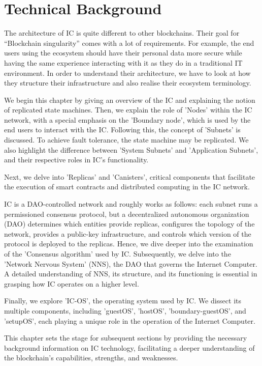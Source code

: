 \chapter{Technical Background}
\label{chap:chaptertwo}

The architecture of IC is quite different to other blockchains. Their goal for “Blockchain singularity” comes with a lot of 
requirements. For example, the end users using the ecosystem should have their personal data more secure while having the same 
experience interacting with it as they do in a traditional IT environment.  In order to understand their architecture, we have to 
look at how they structure their infrastructure and also realise their ecosystem terminology. 

We begin this chapter by giving an overview of the IC and explaining the notion of replicated state machines. Then, we explain the 
role of 'Nodes' within the IC network, with a special emphasis on the 'Boundary node', which is used by the end users to interact 
with the IC. Following this, the concept of 'Subnets' is discussed. To achieve fault tolerance, the state machine may be replicated. 
We also highlight the difference between 'System Subnets' and 'Application Subnets', and their respective roles in IC's functionality.

Next, we delve into 'Replicas' and 'Canisters', critical components that facilitate the execution of smart contracts and distributed 
computing in the IC network. 

IC is a DAO-controlled network and roughly works as follows: each subnet runs a permissioned consensus protocol, but a decentralized 
autonomous organization (DAO) determines which entities provide replicas, configures the topology of the network, provides a 
public-key infrastructure, and controls which version of the protocol is deployed to the replicas. Hence, we dive deeper into the 
examination of the 'Consensus algorithm' used by IC. Subsequently, we delve into the 'Network Nervous System' (NNS), the DAO that 
governs the Internet Computer. A detailed understanding of NNS, its structure, and its functioning is essential in grasping how IC 
operates on a higher level.

Finally, we explore 'IC-OS', the operating system used by IC. We dissect its multiple components, including 'guestOS', 'hostOS', 
'boundary-guestOS', and 'setupOS', each playing a unique role in the operation of the Internet Computer.

This chapter sets the stage for subsequent sections by providing the necessary background information on IC technology, facilitating 
a deeper understanding of the blockchain's capabilities, strengths, and weaknesses.


